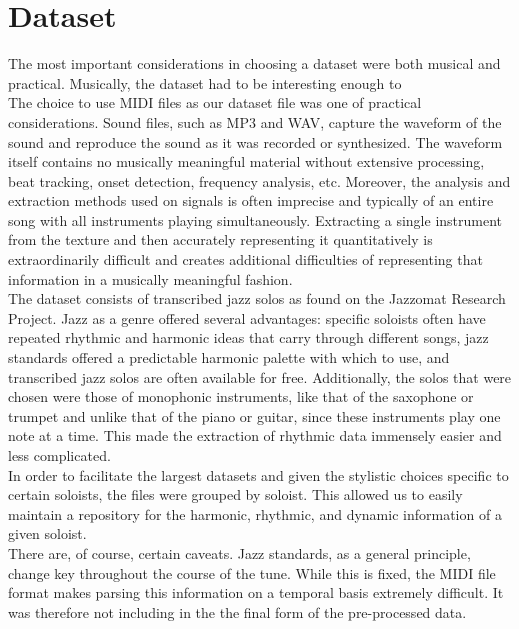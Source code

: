 \documentclass[conference]{IEEEtran}
\begin{document}
\section{Dataset}
The most important considerations in choosing a dataset were both musical and practical. Musically, the dataset had to be interesting enough to\\

The choice to use MIDI files as our dataset file was one of practical considerations. Sound files, such as MP3 and WAV, capture the waveform of the sound and reproduce the sound as it was recorded or synthesized. The waveform itself contains no musically meaningful material without extensive processing, beat tracking, onset detection, frequency analysis, etc. Moreover, the analysis and extraction methods used on signals is often imprecise and typically of an entire song with all instruments playing simultaneously. Extracting a single instrument from the texture and then accurately representing it quantitatively is extraordinarily difficult and creates additional difficulties of representing that information in a musically meaningful fashion.\\

The dataset consists of transcribed jazz solos as found on the Jazzomat Research Project. Jazz as a genre offered several advantages: specific soloists often have repeated rhythmic and harmonic ideas that carry through different songs, jazz standards offered a predictable harmonic palette with which to use, and transcribed jazz solos are often available for free. Additionally, the solos that were chosen were those of monophonic instruments, like that of the saxophone or trumpet and unlike that of the piano or guitar, since these instruments play one note at a time. This made the extraction of rhythmic data immensely easier and less complicated.\\

In order to facilitate the largest datasets and given the stylistic choices specific to certain soloists, the files were grouped by soloist. This allowed us to easily maintain a repository for the harmonic, rhythmic, and dynamic information of a given soloist.\\

There are, of course, certain caveats. Jazz standards, as a general principle, change key throughout the course of the tune. While this is fixed, the MIDI file format makes parsing this information on a temporal basis extremely difficult. It was therefore not including in the the final form of the pre-processed data.
\end{document}
